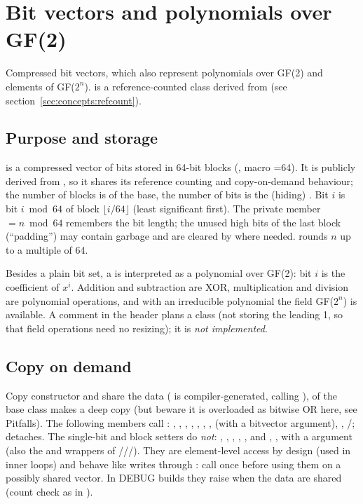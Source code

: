 \chapter{Bit vectors and polynomials over GF(2)}\label{ch:bitvector}

Compressed bit vectors, which also represent polynomials over GF(2) and elements of GF($2^n$).  is a reference-counted class derived from  (see section~\ref{sec:concepts:refcount}).

\section{Purpose and storage}
 is a compressed vector of bits stored in 64-bit blocks
(, macro =64). It is publicly derived from
, so it shares its reference counting and copy-on-demand
behaviour; the number of blocks is  of the base, the number of bits is
the (hiding) . Bit $i$ is bit $i \bmod 64$ of block $\lfloor i/64\rfloor$
(least significant first). The private member  $=n \bmod 64$ remembers the
bit length; the unused high bits of the last block (``padding'') may contain garbage and are
cleared by  where needed.  rounds $n$ up to a
multiple of 64.

Besides a plain bit set, a  is interpreted as a polynomial over GF(2): bit $i$ is
the coefficient of $x^i$. Addition and subtraction are XOR, multiplication and division are
polynomial operations, and with an irreducible polynomial the field GF($2^n$) is available.
A comment in the header plans a  class (not storing the leading 1, so that
field operations need no resizing); it is \emph{not implemented}.

\section{Copy on demand}
Copy constructor and  share the data ( is compiler-generated,
calling ), \code{|=} of the base class makes a deep copy (but beware it is
overloaded as bitwise OR here, see Pitfalls). The following members call :
, , , , , \code{&=}, \code{|=}, \code{^=}
(with a bitvector argument), \code{>>=}, /\code{<<=};  detaches.
The single-bit and block setters do \emph{not}: , , , ,
, and \code{&=}, \code{|=}, \code{^=} with a  argument (also the
 and  wrappers of ///).
They are element-level access by design (used in inner loops) and behave like writes through :
call  once before using them on a possibly shared vector. In DEBUG builds they raise 
when the data are shared (count check as in ).

